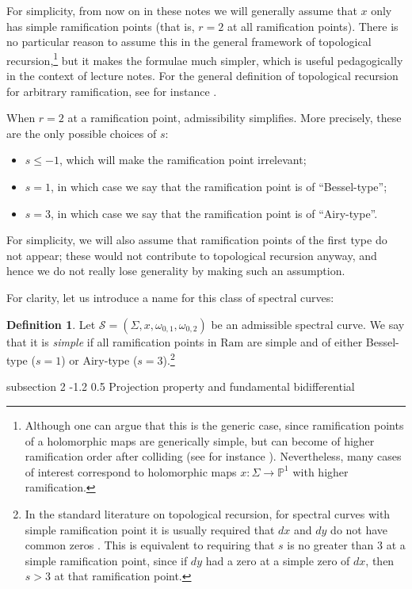 \documentclass[reqno,oneside,11pt]{amsart}
\makeatletter
\theoremstyle{plain}
\theoremstyle{definition}
\newtheorem{definition}[theorem]{Definition}
\theoremstyle{remark}
\numberwithin{equation}{section}
\renewcommand{\subsection}{\@startsection
{subsection}%
{2}%
{\z@}%
{-1.2\baselineskip}%
{0.5\baselineskip}%
{\normalfont \bf \normalsize}} %
\newcommand{\Ra}{\text{Ram}}
\makeatother
\begin{document}
For simplicity, from now on in these notes we will generally assume that $x$ only has simple ramification points (that is, $r=2$ at all ramification points). There is no particular reason to assume this in the general framework of topological recursion,\footnote{Although one can argue that this is the generic case, since ramification points of a holomorphic maps are generically simple, but can become of higher ramification order after colliding (see for instance \cite{BBCKS23}). Nevertheless, many cases of interest correspond to holomorphic maps $x: \Sigma \to \mathbb{P}^1$ with higher ramification.} but it makes the formulae much simpler, which is useful pedagogically in the context of lecture notes. For the general definition of topological recursion for arbitrary ramification, see for instance \cite{BE13,BE17,BBCCN18,BKS20,BBCKS23,}.

When $r=2$ at a ramification point, admissibility simplifies. More precisely, these are the only possible choices of $s$:
\begin{itemize}
\item $s \leq -1$, which will make the ramification point irrelevant;
\item $s=1$, in which case we say that the ramification point is of ``Bessel-type'';
\item $s=3$, in which case we say that the ramification point is of ``Airy-type''.
\end{itemize}
For simplicity, we will also assume that ramification points of the first type do not appear; these would not contribute to topological recursion anyway, and hence we do not really lose generality by making such an assumption.

 For clarity, let us introduce a name for this class of spectral curves:
\begin{definition}
Let  $\mathcal{S} = (\Sigma,x,\omega_{0,1}, \omega_{0,2})$ be an admissible spectral curve. We say that it is \emph{simple} if all ramification points in $\Ra$ are simple and of either Bessel-type ($s=1$) or Airy-type ($s=3$).\footnote{In the standard literature on topological recursion, for spectral curves with simple ramification point it is usually required that $dx$ and $dy$ do not have common zeros \cite{EO07,EO08}. This is equivalent to requiring that $s$ is no greater than $3$ at a simple ramification point, since if $dy$  had a zero at a simple zero of $dx$, then $s > 3$ at that ramification point.}
\end{definition}


\subsection{Projection property and fundamental bidifferential}
\end{document}
